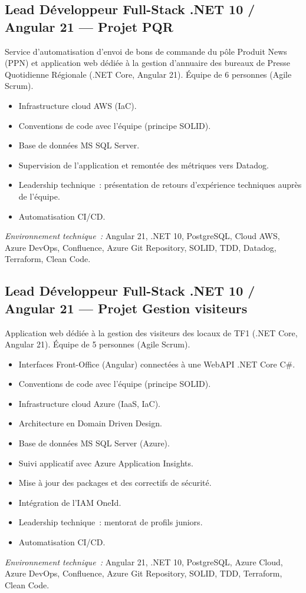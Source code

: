 \documentclass[10pt,a4paper]{article}
\begin{document}
\vspace{6pt}

\subsection*{Lead Développeur Full-Stack .NET 10 / Angular 21 --- Projet PQR}
\color{darkgray}
Service d'automatisation d'envoi de bons de commande du pôle Produit News (PPN) et application web dédiée à la gestion d'annuaire des bureaux de Presse Quotidienne Régionale (.NET Core, Angular 21). Équipe de 6 personnes (Agile Scrum).
\begin{itemize}
  \item Infrastructure cloud AWS (IaC).
  \item Conventions de code avec l'équipe (principe SOLID).
  \item Base de données MS SQL Server.
  \item Supervision de l'application et remontée des métriques vers Datadog.
  \item Leadership technique~: présentation de retours d'expérience techniques auprès de l'équipe.
  \item Automatisation CI/CD.
\end{itemize}
\textit{Environnement technique~:} Angular 21, .NET 10, PostgreSQL, Cloud AWS, Azure DevOps, Confluence, Azure Git Repository, SOLID, TDD, Datadog, Terraform, Clean Code.

\vspace{6pt}

\subsection*{Lead Développeur Full-Stack .NET 10 / Angular 21 --- Projet Gestion visiteurs}
\color{darkgray}
Application web dédiée à la gestion des visiteurs des locaux de TF1 (.NET Core, Angular 21). Équipe de 5 personnes (Agile Scrum).
\begin{itemize}
  \item Interfaces Front-Office (Angular) connectées à une WebAPI .NET Core C\#.
  \item Conventions de code avec l'équipe (principe SOLID).
  \item Infrastructure cloud Azure (IaaS, IaC).
  \item Architecture en Domain Driven Design.
  \item Base de données MS SQL Server (Azure).
  \item Suivi applicatif avec Azure Application Insights.
  \item Mise à jour des packages et des correctifs de sécurité.
  \item Intégration de l'IAM OneId.
  \item Leadership technique~: mentorat de profils juniors.
  \item Automatisation CI/CD.
\end{itemize}
\textit{Environnement technique~:} Angular 21, .NET 10, PostgreSQL, Azure Cloud, Azure DevOps, Confluence, Azure Git Repository, SOLID, TDD, Terraform, Clean Code.
\end{document}
